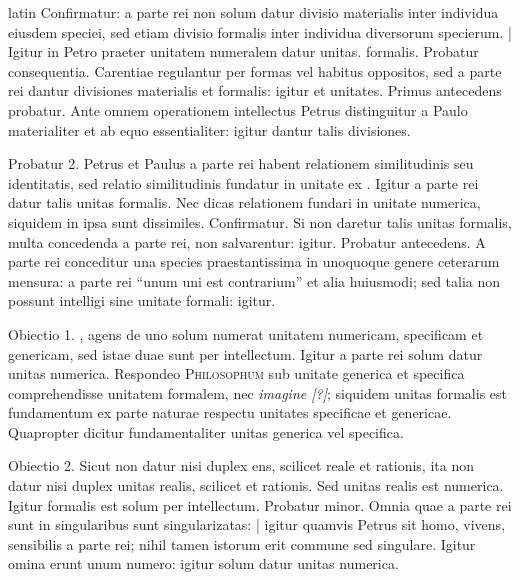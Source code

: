\begin{otherlanguage*}{latin}
\pstart
Confirmatur:
a parte rei non solum datur divisio materialis inter individua eiusdem speciei, sed etiam divisio formalis inter individua diversorum specierum. \textnormal{|} Igitur in Petro praeter unitatem numeralem datur unitas. formalis. Probatur consequentia. Carentiae regulantur per formas vel habitus oppositos, sed a parte rei dantur divisiones materialis et formalis:
igitur et unitates. Primus antecedens probatur. Ante omnem operationem intellectus Petrus distinguitur a Paulo materialiter et ab equo essentialiter:
igitur dantur talis divisiones. 
\pend

\pstart
Probatur 2. Petrus et Paulus a parte rei habent relationem similitudinis seu identitatis, sed relatio similitudinis fundatur in unitate ex . Igitur a parte rei datur talis unitas formalis. Nec dicas relationem fundari in unitate numerica, siquidem in ipsa sunt dissimiles. Confirmatur. Si non daretur talis unitas formalis, multa concedenda a parte rei, non salvarentur:
igitur. Probatur antecedens. A parte rei conceditur una species praestantissima in unoquoque genere ceterarum mensura:
a parte rei \enquote{unum uni est contrarium} et alia huiusmodi; sed talia non possunt intelligi sine unitate formali:
igitur. 
\pend

\pstart
Obiectio 1. , agens de uno solum numerat unitatem numericam, specificam et genericam, sed istae duae sunt per intellectum. Igitur a parte rei solum datur unitas numerica. Respondeo \textsc{Philosophum} sub unitate generica et specifica comprehendisse unitatem formalem, nec \emph{imagine [?]}; siquidem unitas formalis est fundamentum ex parte naturae respectu unitates specificae et genericae. Quapropter dicitur fundamentaliter unitas generica vel specifica. 
\pend

\pstart
Obiectio 2. Sicut non datur nisi duplex ens, scilicet reale et rationis, ita non datur nisi duplex unitas realis, scilicet et rationis. Sed unitas realis est numerica. Igitur formalis est solum per intellectum. Probatur minor. Omnia quae a parte rei sunt in singularibus sunt singularizatas:
\textnormal{|} igitur quamvis Petrus sit homo, vivens, sensibilis a parte rei; nihil tamen istorum erit commune sed singulare. Igitur omina erunt unum numero:
igitur solum datur unitas numerica. 
\pend


\end{otherlanguage*}
